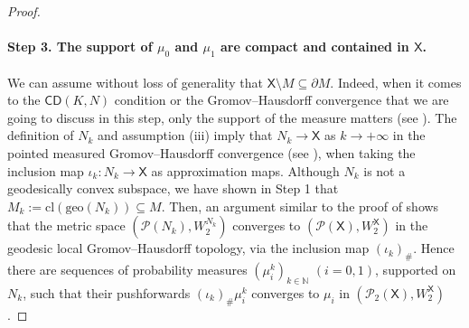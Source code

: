 \documentclass[11pt,twoside,a4paper]{article}
\newcommand{\red}{\color{red}}
\newcommand{\blue}{\color{blue}}
\newcommand{\N}{\mathbb{N}}
\newcommand{\prob}{\mathscr P}
\newcommand{\X}{\mathsf{X}}
\theoremstyle{theorem}
\theoremstyle{definition}
\theoremstyle{remark}
\theoremstyle{proof}
\begin{document}
\begin{proof}
    \paragraph{Step 3. The support of $\mu_0$ and $\mu_1$ are compact and contained in $\X$.}
    We can assume without loss of generality that $\X \setminus M \subseteq \partial M$. Indeed, when it comes to the $\mathsf{CD}(K, N)$ condition or the Gromov--Hausdorff convergence that we are going to discuss in this step, only the support of the measure matters (see \cite[Remark 3.1]{gigli2015}).
    The definition of $N_k$ and assumption (iii) imply that $N_k \to \X$ as $k \to +\infty$ in the pointed measured Gromov--Hausdorff convergence (see \cite[Definition 3.9]{gigli2015}), when taking the inclusion map $\iota_k:N_k\to \X$ as approximation maps.
Although $N_k$ is not a geodesically convex subspace, we have shown in Step 1 that $M_k := \mathrm{cl}(\mathrm{geo}(N_k)) \subseteq M$.
Then, an argument similar to the proof of \cite[Theorem 28.13]{villani} shows that the metric space $(\prob(N_k),W_2^{N_k})$ converges to $(\prob(\X),W_2^\X)$ in the geodesic local Gromov--Hausdorff topology, via the inclusion map $(\iota_k)_\#$. Hence there are sequences of probability measures $(\mu_i^k)_{k\in\N}$ $(i=0,1)$, supported on $N_k$, such that their pushforwards $(\iota_k)_\#\mu_i^k$ converges to $\mu_i$ in $(\prob_2(\X),W_2^\X)$.

\end{proof}
\end{document}

